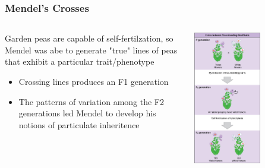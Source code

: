\documentclass{beamer}
\begin{document}
\begin{frame}
	
	\frametitle{Mendel's Crosses}

	
\begin{columns}
	\begin{column}{0.5\textwidth}
			Garden peas are capable of self-fertilzation, so Mendel was abe to generate "true" lines of peas that exhibit a particular trait/phenotype
		\begin{itemize}
	\item	Crossing lines produces an F1 generation 	
	\item 	The patterns of variation among the F2 generations led Mendel to develop his notions of particulate inheritence
		\end{itemize}
		


	\end{column}
	\begin{column}{0.6\textwidth}  
\begin{center}
			\includegraphics[keepaspectratio, width  =0.6\textwidth]{img/mendelCross_1}
\end{center}
\end{column}
\end{columns}
\end{frame}
\end{document}
